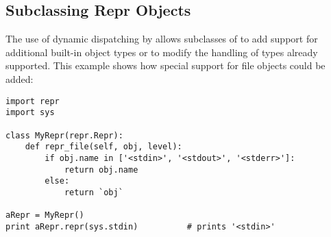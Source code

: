 \subsection{Subclassing Repr Objects \label{subclassing-reprs}}

The use of dynamic dispatching by  allows
subclasses of  to add support for additional built-in
object types or to modify the handling of types already supported.
This example shows how special support for file objects could be
added:

\begin{verbatim}
import repr
import sys

class MyRepr(repr.Repr):
    def repr_file(self, obj, level):
        if obj.name in ['<stdin>', '<stdout>', '<stderr>']:
            return obj.name
        else:
            return `obj`

aRepr = MyRepr()
print aRepr.repr(sys.stdin)          # prints '<stdin>'
\end{verbatim}
